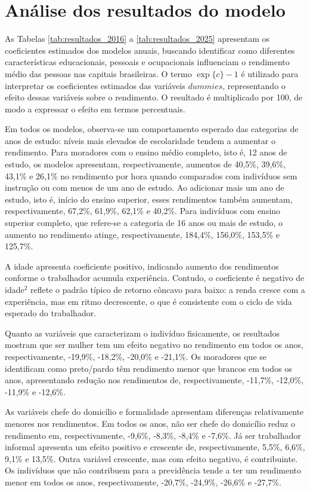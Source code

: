 \documentclass[12pt,a4paper,header]{abnt}
\begin{document}
\FloatBarrier
\section{Análise dos resultados do modelo}
As Tabelas \ref{tab:resultados_2016} a \ref{tab:resultados_2025} apresentam os coeficientes estimados dos modelos anuais, buscando identificar como diferentes características educacionais, pessoais e ocupacionais influenciam o rendimento médio das pessoas nas capitais brasileiras. O termo $\exp\{c\}-1$ é utilizado para interpretar os coeficientes estimados das variáveis $dummies$, representando o efeito dessas variáveis sobre o rendimento. O resultado é multiplicado por 100, de modo a expressar o efeito em termos percentuais.

Em todos os modelos, observa-se um comportamento esperado das categorias de anos de estudo: níveis mais elevados de escolaridade tendem a aumentar o rendimento. Para moradores com o ensino médio completo, isto é, 12 anos de estudo, os modelos apresentam, respectivamente, aumentos de 40,5\%, 39,6\%, 43,1\% e 26,1\% no rendimento por hora quando comparados com indivíduos sem instrução ou com menos de um ano de estudo. Ao adicionar mais um ano de estudo, isto é, início do ensino superior, esses rendimentos também aumentam, respectivamente, 67,2\%, 61,9\%, 62,1\% e 40,2\%. Para indivíduos com ensino superior completo, que refere-se a categoria de 16 anos ou mais de estudo, o aumento no rendimento atinge, respectivamente, 184,4\%, 156,0\%, 153,5\% e 125,7\%.

A idade apresenta coeficiente positivo, indicando aumento dos rendimentos conforme o trabalhador acumula experiência. Contudo, o coeficiente é negativo de idade$^2$ reflete o padrão típico de retorno côncavo para baixo: a renda cresce com a experiência, mas em ritmo decrescente, o que é consistente com o ciclo de vida esperado do trabalhador.

Quanto as variáveis que caracterizam o indivíduo fisicamente, os resultados mostram que ser mulher tem um efeito negativo no rendimento em todos os anos, respectivamente, -19,9\%, -18,2\%, -20,0\% e -21,1\%. Os moradores que se identificam como preto/pardo têm rendimento menor que brancos em todos os anos, apresentando redução nos rendimentos de, respectivamente, -11,7\%, -12,0\%, -11,9\% e -12,6\%.

As variáveis chefe do domicílio e formalidade apresentam diferenças relativamente menores nos rendimentos. Em todos os anos, não ser chefe do domicílio reduz o rendimento em, respectivamente, -9,6\%, -8,3\%, -8,4\% e -7,6\%. Já ser trabalhador informal apresenta um efeito positivo e crescente de, respectivamente, 5,5\%, 6,6\%, 9,1\% e 13,5\%. Outra variável crescente, mas com efeito negativo, é contribuinte. Os indivíduos que não contribuem para a previdência tende a ter um rendimento menor em todos os anos, respectivamente, -20,7\%, -24,9\%, -26,6\% e -27,7\%.
\end{document}
